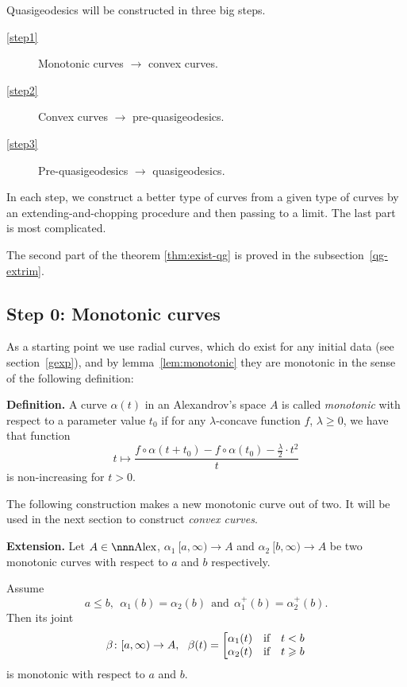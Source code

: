 \documentclass{article}
\begin{document}
Quasigeodesics will be constructed in three big steps. 
\begin{description}
\item [\ref{step1}] Monotonic curves $\longrightarrow$ convex curves.
\item [\ref{step2}] Convex curves $\longrightarrow$ pre-quasigeodesics.
\item [\ref{step3}] Pre-quasigeodesics $\longrightarrow$ quasigeodesics.
\end{description}

In each step, we construct a better type of curves from a given type of curves
by an extending-and-chopping procedure and then passing to a limit.
The last part is most complicated.

The second part of the theorem \ref{thm:exist-qg} 
is
proved in the subsection~\ref{qg-extrim}.








\setcounter{subsection}{-1}
\subsection{Step 0: Monotonic curves} 

As a starting point we use radial curves, which do exist for any initial data
(see section~\ref{gexp}), and by lemma~\ref{lem:monotonic} 
they are monotonic in the
sense of the following definition:

\begin{thm}{\bf Definition.}
A curve $\alpha(t)$ in an Alexandrov's space $A$ is called \emph{monotonic} with
respect to a parameter value $t_0$ if for any $\lambda$-concave function $f$,
$\lambda\ge 0$, we have that function
$$t
\mapsto
\frac{f\circ\alpha(t+t_0)-f\circ\alpha(t_0)-\tfrac\lambda2{\cdot}t^2}t$$ 
is non-increasing for $t>0$. 
\end{thm}

The following construction makes a new monotonic curve out of two. 
It will be used in the next section to construct \emph{convex curves}.

\begin{thm}{\bf Extension.}\label{ext-mono}
Let $A\in\Alex$, $\alpha_1\:[a,\infty)\to A$ and $\alpha_2\:[b,\infty)\to A$ be two
monotonic curves with respect to $a$ and $b$ respectively. 

Assume 
$$a\le b,
\ \ \alpha_1(b)=\alpha_2(b)
\ \ \text{and}\ \
\alpha^+_1(b)=\alpha^+_2(b).$$ 
Then its joint
$$\beta\:[a,\infty)\to A,
\ \ 
\beta(t)=\l[
\begin{matrix}
\alpha_1(t)&\text{if}&t< b\\
\alpha_2(t)&\text{if}&t\ge b
\end{matrix}\right.
$$
is monotonic with respect to $a$ and $b$.
\end{thm}
\end{document}
